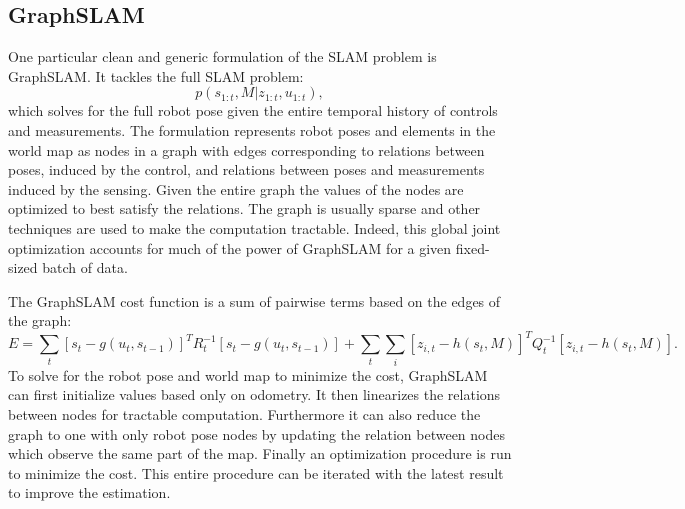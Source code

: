 \documentclass{article}
\begin{document}
\subsection{GraphSLAM}

One particular clean and generic formulation of the SLAM problem is GraphSLAM.  It tackles the full SLAM problem:
\begin{equation}
p(s_{1:t}, M | z_{1:t}, u_{1:t}),
\end{equation}
which solves for the full robot pose given the entire temporal history of controls and measurements.  The formulation represents robot poses and elements in the world map as nodes in a graph with edges corresponding to relations between poses, induced by the control, and relations between poses and measurements induced by the sensing.  Given the entire graph the values of the nodes are optimized to best satisfy the relations.  The graph is usually sparse and other techniques are used to make the computation tractable.  Indeed, this global joint optimization accounts for much of the power of GraphSLAM for a given fixed-sized batch of data.

The GraphSLAM cost function is a sum of pairwise terms based on the edges of the graph:
\begin{equation}
E = \sum_t [s_t - g(u_t, s_{t-1})]^T R_t^{-1} [s_t - g(u_t, s_{t-1})] + \sum_t \sum_i [z_{i, t} - h(s_t, M)]^T Q_t^{-1} [z_{i, t} - h(s_t, M)].
\end{equation}
To solve for the robot pose and world map to minimize the cost, GraphSLAM can first initialize values based only on odometry.  It then linearizes the relations between nodes for tractable computation.  Furthermore it can also reduce the graph to one with only robot pose nodes by updating the relation between nodes which observe the same part of the map.  Finally an optimization procedure is run to minimize the cost.  This entire procedure can be iterated with the latest result to improve the estimation.
\end{document}
